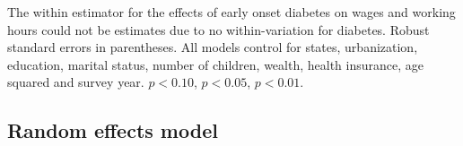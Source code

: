 \documentclass[12pt,english]{article}
\begin{document}
\begin{table}[p]
\begin{center}
\begin{adjustbox}{max width=\linewidth}
\begin{threeparttable}
{\begin{tabular}{l*{6}{S S}}
						\bottomrule
					\end{tabular}
					\begin{tablenotes}
						\item \footnotesize  The within estimator for the effects of early onset diabetes on wages and working hours could not be estimates due to no within-variation for diabetes. Robust standard errors in parentheses. All models control for  states, urbanization, education, marital status, number of children, wealth, health insurance, age squared and survey year. \sym{*} \(p<0.10\), \sym{**} \(p<0.05\), \sym{***} \(p<0.01\).
					\end{tablenotes}
				}
			\end{threeparttable}
		\end{adjustbox}
	\end{center}
\end{table}

\clearpage

\subsection*{Random effects model}
\end{document}
